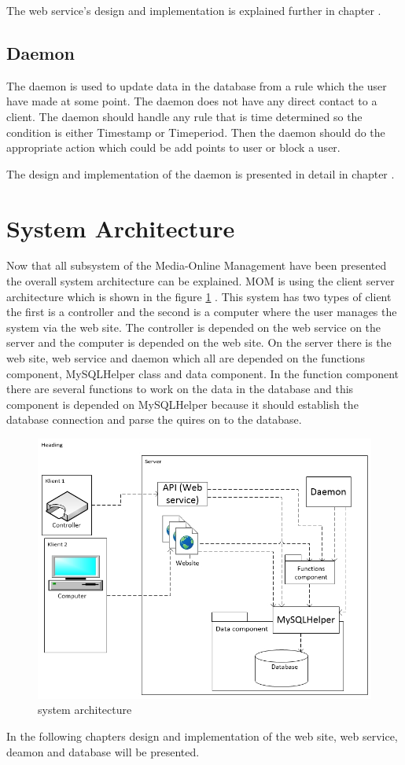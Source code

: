 The web service's design and implementation is explained further in chapter .


\subsection{Daemon}
The daemon is used to update data in the database from a rule which the user have made at some point. The daemon does not have any direct contact to a client. The daemon should handle any rule that is time determined so the condition is either Timestamp or Timeperiod. Then the daemon should do the appropriate action which could be add points to user or block a user.

The design and implementation of the daemon is presented in detail in chapter . 
 
\section{System Architecture}
\label{sec:sysArchitecture}
Now that all subsystem of the Media-Online Management have been presented the overall system architecture can be explained. MOM is using the client server architecture which is shown in the figure \ref{fig:serveroverview} \citep{OOAD}. This system has two types of client the first is a controller and the second is a computer where the user manages the system via the web site. The controller is depended on the web service on the server and the computer is depended on the web site. On the server there is the web site, web service and daemon which all are depended on the functions component, MySQLHelper class and data component. In the function component there are several functions to work on the data in the database and this component is depended on MySQLHelper because it should establish the database connection and parse the quires on to the database. 

\begin{figure}
	\centering
		\includegraphics[width=1.00\textwidth]{images/serveroverview.jpg}
	\caption{system architecture}
	\label{fig:serveroverview}
\end{figure}

In the following chapters design and implementation of the web site, web service, deamon and database will be presented.

 



